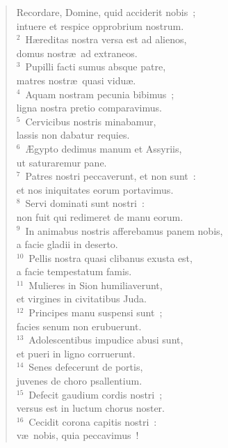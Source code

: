 \begin{flushleft}\begin{verse}\vspace{-19pt}Recordare, Domine, quid acciderit nobis~;\\ intuere et respice opprobrium nostrum.\\
${}^{2}$~H\ae reditas nostra versa est ad alienos,\\ domus nostr\ae\ ad extraneos.\\
${}^{3}$~Pupilli facti sumus absque patre,\\ matres nostr\ae\ quasi vidu\ae .\\
${}^{4}$~Aquam nostram pecunia bibimus~;\\ ligna nostra pretio comparavimus.\\
${}^{5}$~Cervicibus nostris minabamur,\\ lassis non dabatur requies.\\
${}^{6}$~\AE gypto dedimus manum et Assyriis,\\ ut saturaremur pane.\\
${}^{7}$~Patres nostri peccaverunt, et non sunt~:\\ et nos iniquitates eorum portavimus.\\
${}^{8}$~Servi dominati sunt nostri~:\\ non fuit qui redimeret de manu eorum.\\
${}^{9}$~In animabus nostris afferebamus panem nobis,\\ a facie gladii in deserto.\\
${}^{10}$~Pellis nostra quasi clibanus exusta est,\\ a facie tempestatum famis.\\
${}^{11}$~Mulieres in Sion humiliaverunt,\\ et virgines in civitatibus Juda.\\
${}^{12}$~Principes manu suspensi sunt~;\\ facies senum non erubuerunt.\\
${}^{13}$~Adolescentibus impudice abusi sunt,\\ et pueri in ligno corruerunt.\\
${}^{14}$~Senes defecerunt de portis,\\ juvenes de choro psallentium.\\
${}^{15}$~Defecit gaudium cordis nostri~;\\ versus est in luctum chorus noster.\\
${}^{16}$~Cecidit corona capitis nostri~:\\ v\ae\ nobis, quia peccavimus~!\\

\end{verse}
\end{flushleft}
